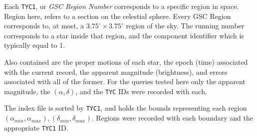 Each \texttt{TYC1}, or \textit{GSC Region Number} corresponds to a specific region in space.
Region here, refers to a section on the celestial sphere.
Every GSC Region corresponds to, at most, a $3.75^\circ \times 3.75^\circ$ region of the sky.
The running number corresponds to a star inside that region, and the component identifier which is typically equal to 1.

Also contained are the proper motions of each star, the epoch (time) associated with the current record, the apparent
magnitude (brightness), and errors associated with all of the former.
For the queries tested here only the apparent magnitude, the $(\alpha, \delta)$, and the \texttt{TYC} IDs were recorded
with each.

The index file is sorted by \texttt{TYC1}, and holds the bounds representing each region $\left(\alpha_{min},
\alpha_{max}\right), \left(\delta_{min}, \delta_{max}\right)$.
Regions were recorded with each boundary and the appropriate \texttt{TYC1} ID.


